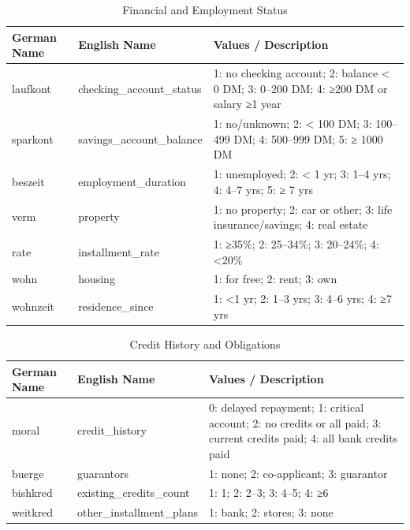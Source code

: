 \begin{table}[t]
\small
\caption{Financial and Employment Status}
\begin{tabularx}{\textwidth}{>{\ttfamily}l l X}
\toprule
\label{tab:financial}
\textbf{German Name} & \textbf{English Name} & \textbf{Values / Description} \\
\midrule
laufkont  & checking\_account\_status                & 1: no checking account; 2: balance < 0 DM; 3: 0–200 DM; 4: ≥200 DM or salary ≥1 year \\
sparkont  & savings\_account\_balance               & 1: no/unknown; 2: < 100 DM; 3: 100–499 DM; 4: 500–999 DM; 5: ≥ 1000 DM \\
beszeit   & employment\_duration  & 1: unemployed; 2: < 1 yr; 3: 1–4 yrs; 4: 4–7 yrs; 5: ≥ 7 yrs \\
verm      & property              & 1: no property; 2: car or other; 3: life insurance/savings; 4: real estate \\
rate      & installment\_rate     & 1: ≥35\%; 2: 25–34\%; 3: 20–24\%; 4: <20\% \\
wohn      & housing               & 1: for free; 2: rent; 3: own \\
wohnzeit  & residence\_since    & 1: <1 yr; 2: 1–3 yrs; 3: 4–6 yrs; 4: ≥7 yrs \\
\bottomrule
\end{tabularx}
\end{table}

\begin{table}[t]
\small
\caption{Credit History and Obligations}
\begin{tabularx}{\textwidth}{>{\ttfamily}l l X}
\toprule
\label{tab:credit}
\textbf{German Name} & \textbf{English Name} & \textbf{Values / Description} \\
\midrule
moral     & credit\_history           & 0: delayed repayment; 1: critical account; 2: no credits or all paid; 3: current credits paid; 4: all bank credits paid \\
buerge    & guarantors            & 1: none; 2: co-applicant; 3: guarantor \\
bishkred  & existing\_credits\_count           & 1: 1; 2: 2–3; 3: 4–5; 4: ≥6 \\
weitkred  & other\_installment\_plans & 1: bank; 2: stores; 3: none \\
\bottomrule
\end{tabularx}
\end{table}

